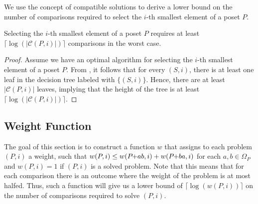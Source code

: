 \documentclass[a4paper,UKenglish,cleveref, autoref, thm-restate]{lipics-v2021}
\newcommand{\pchild}[3]{{#1}\kern-1pt{+}{#2}{#3}}
\begin{document}
We use the concept of compatible solutions to derive a lower bound on the number of comparisons required to select the $i$-th smallest element of a poset $P$.

\begin{theorem}\label{theorem:compatible_log}
  Selecting the $i$-th smallest element of a poset $P$ requires at least $\lceil\log(|\mathcal{C}(P, i)|)\rceil$ comparisons in the worst case.
\end{theorem}

\begin{proof}
  Assume we have an optimal algorithm for selecting the $i$-th smallest element of a poset $P$.
  From , it follows that for every $(S, i)$, there is at least one leaf in the decision tree labeled with $\{(S, i)\}$.
  Hence, there are at least $|\mathcal{C}(P, i)|$ leaves, implying that the height of the tree is at least $\lceil\log(|\mathcal{C}(P, i)|)\rceil$.
\end{proof}


\subsection{Weight Function}

The goal of this section is to construct a function $w$ that assigns to each problem $(P, i)$ a weight, such that $w(P,i) \le w(\pchild{P}{a}{b}, i) + w(\pchild{P}{b}{a},i)$ for each $a,b \in \Omega_P$ and $w(P,i) = 1$ if $(P, i)$ is a solved problem.
Note that this means that for each comparison there is an outcome where the weight of the problem is at most halfed.
Thus, such a function will give us a lower bound of $\lceil\log(w(P, i))\rceil$ on the number of comparisons required to solve $(P, i)$.
\end{document}
